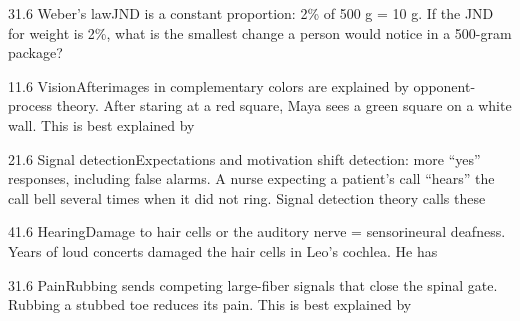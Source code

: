 \documentclass[11pt]{article}
\begin{document}
\begin{q}{3}{1.6 Weber's law}{JND is a constant proportion: 2\% of 500 g = 10 g.}
If the JND for weight is 2\%, what is the smallest change a person would notice in a 500-gram package?
\end{q}

\begin{q}{1}{1.6 Vision}{Afterimages in complementary colors are explained by opponent-process theory.}
After staring at a red square, Maya sees a green square on a white wall. This is best explained by
\end{q}

\begin{q}{2}{1.6 Signal detection}{Expectations and motivation shift detection: more ``yes'' responses, including false alarms.}
A nurse expecting a patient's call ``hears'' the call bell several times when it did not ring. Signal detection theory calls these
\end{q}

\begin{q}{4}{1.6 Hearing}{Damage to hair cells or the auditory nerve = sensorineural deafness.}
Years of loud concerts damaged the hair cells in Leo's cochlea. He has
\end{q}

\begin{q}{3}{1.6 Pain}{Rubbing sends competing large-fiber signals that close the spinal gate.}
Rubbing a stubbed toe reduces its pain. This is best explained by
\end{q}

\makekey
\end{document}
